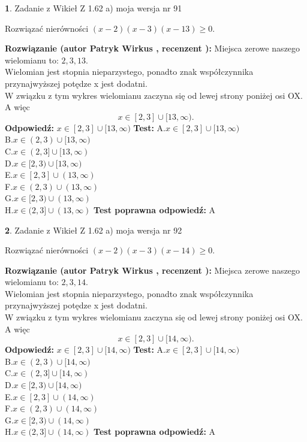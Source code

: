\documentclass[12pt, a4paper]{article}
\theoremstyle{definition} %
\newtheorem{zad}{}
\newcommand{\zadStart}[1]{\begin{zad}#1\newline}
\newcommand{\zadStop}{\end{zad}}
\newcommand{\rozwStart}[2]{\noindent \textbf{Rozwiązanie (autor #1 , recenzent #2): }\newline}
\newcommand{\rozwStop}{\newline}
\newcommand{\odpStart}{\noindent \textbf{Odpowiedź:}\newline}
\newcommand{\odpStop}{\newline}
\newcommand{\testStart}{\noindent \textbf{Test:}\newline}
\newcommand{\testStop}{\newline}
\newcommand{\kluczStart}{\noindent \textbf{Test poprawna odpowiedź:}\newline}
\newcommand{\kluczStop}{\newline}
\begin{document}
\zadStart{Zadanie z Wikieł Z 1.62 a) moja wersja nr 91}

Rozwiązać nierówności $(x-2)(x-3)(x-13)\ge0$.
\zadStop
\rozwStart{Patryk Wirkus}{}
Miejsca zerowe naszego wielomianu to: $2, 3, 13$.\\
Wielomian jest stopnia nieparzystego, ponadto znak współczynnika przy\linebreak najwyższej potędze x jest dodatni.\\ W związku z tym wykres wielomianu zaczyna się od lewej strony poniżej osi OX. A więc $$x \in [2,3] \cup [13,\infty).$$
\rozwStop
\odpStart
$x \in [2,3] \cup [13,\infty)$
\odpStop
\testStart
A.$x \in [2,3] \cup [13,\infty)$\\
B.$x \in (2,3) \cup [13,\infty)$\\
C.$x \in (2,3] \cup [13,\infty)$\\
D.$x \in [2,3) \cup [13,\infty)$\\
E.$x \in [2,3] \cup (13,\infty)$\\
F.$x \in (2,3) \cup (13,\infty)$\\
G.$x \in [2,3) \cup (13,\infty)$\\
H.$x \in (2,3] \cup (13,\infty)$
\testStop
\kluczStart
A
\kluczStop



\zadStart{Zadanie z Wikieł Z 1.62 a) moja wersja nr 92}

Rozwiązać nierówności $(x-2)(x-3)(x-14)\ge0$.
\zadStop
\rozwStart{Patryk Wirkus}{}
Miejsca zerowe naszego wielomianu to: $2, 3, 14$.\\
Wielomian jest stopnia nieparzystego, ponadto znak współczynnika przy\linebreak najwyższej potędze x jest dodatni.\\ W związku z tym wykres wielomianu zaczyna się od lewej strony poniżej osi OX. A więc $$x \in [2,3] \cup [14,\infty).$$
\rozwStop
\odpStart
$x \in [2,3] \cup [14,\infty)$
\odpStop
\testStart
A.$x \in [2,3] \cup [14,\infty)$\\
B.$x \in (2,3) \cup [14,\infty)$\\
C.$x \in (2,3] \cup [14,\infty)$\\
D.$x \in [2,3) \cup [14,\infty)$\\
E.$x \in [2,3] \cup (14,\infty)$\\
F.$x \in (2,3) \cup (14,\infty)$\\
G.$x \in [2,3) \cup (14,\infty)$\\
H.$x \in (2,3] \cup (14,\infty)$
\testStop
\kluczStart
A
\kluczStop
\end{document}

